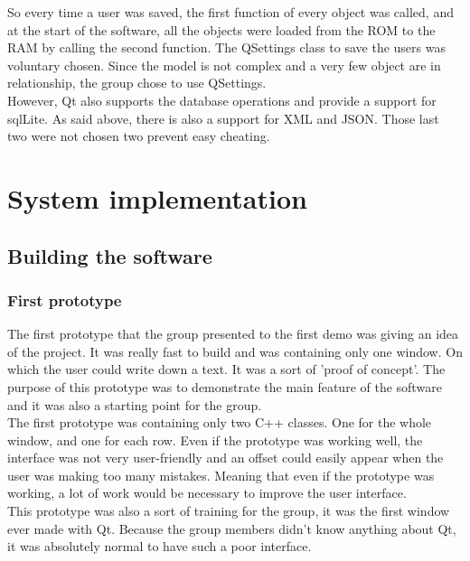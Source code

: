 So every time a user was saved, the first function of every object was called, and at the start of the software, all the objects were loaded from the ROM to the RAM by calling the second function. The QSettings class to save the users was voluntary chosen. Since the model is not complex and a very few object are in relationship, the group chose to use QSettings. \\
However, Qt also supports the database operations and provide a support for sqlLite. As said above, there is also a support for XML and JSON. Those last two were not chosen two prevent easy cheating.


\part{System implementation}

\chapter{Building the software}
\section{First prototype}
The first prototype that the group presented to the first demo was giving an idea of the project. It was really fast to build and was containing only one window. On which the user could write down a text. It was a sort of 'proof of concept'. The purpose of this prototype was to demonstrate the main feature of the software and it was also a starting point for the group.\\
The first prototype was containing only two C++ classes. One for the whole window, and one for each row. Even if the prototype was working well, the interface was not very user-friendly and an offset could easily appear when the user was making too many mistakes.
Meaning that even if the prototype was working, a lot of work would be necessary to improve the user interface. \\
This prototype was also a sort of training for the group, it was the first window ever made with Qt. Because the group members didn't know anything about Qt, it was absolutely normal to have such a poor interface.


